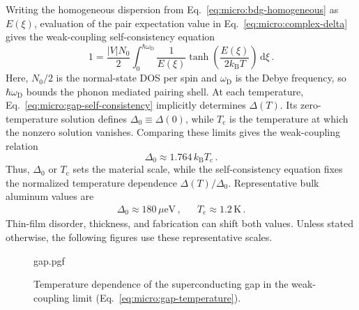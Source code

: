             Writing the homogeneous dispersion from Eq.~\eqref{eq:micro:bdg-homogeneous} as $E(\xi)$, evaluation of the pair expectation value in Eq.~\eqref{eq:micro:complex-delta} gives the weak-coupling self-consistency equation
            \begin{equation}
                1
                =\frac{|V|N_0}{2}
                \int_0^{\hbar\omega_\mathrm{D}}
                \frac{1}{E(\xi)}
                \tanh\!\left(\frac{E(\xi)}{2k_\mathrm{B}T}\right)
                \,\mathrm d\xi\,.
                \label{eq:micro:gap-self-consistency}
            \end{equation}
            Here, $N_0/2$ is the normal-state DOS per spin and $\omega_\mathrm{D}$ is the Debye frequency, so $\hbar\omega_\mathrm{D}$ bounds the phonon mediated pairing shell. At each temperature, Eq.~\eqref{eq:micro:gap-self-consistency} implicitly determines $\Delta(T)$. Its zero-temperature solution defines $\Delta_0\equiv\Delta(0)$, while $T_\mathrm{c}$ is the temperature at which the nonzero solution vanishes. Comparing these limits gives the weak-coupling relation
            \begin{equation}
                \Delta_0
                \approx 1.764\, k_\mathrm{B} T_\mathrm{c}\,.
                \label{eq:micro:gap-zero-temperature}
            \end{equation}
            Thus, $\Delta_0$ or $T_\mathrm{c}$ sets the material scale, while the self-consistency equation fixes the normalized temperature dependence $\Delta(T)/\Delta_0$. \cite{bardeen_theory_1957,tinkham_introduction_2004}
            Representative bulk aluminum values are
            \begin{align}
                \Delta_0 \approx 180\,\mu\mathrm{eV}\,, &&
                T_\mathrm{c} \approx 1.2\,\mathrm{K}\,.
                \label{eq:micro:aluminum-scales}
            \end{align}
            Thin-film disorder, thickness, and fabrication can shift both values. Unless stated otherwise, the following figures use these representative scales. \cite{giaever_study_1961,tinkham_introduction_2004}

            \begin{figure}
                \captionsetup{format=plain}%
                \centering
                \vspace{-1em}
                {gap.pgf}
                \vspace{-.5em}
                \caption{Temperature dependence of the superconducting gap in the weak-coupling limit (Eq.~\ref{eq:micro:gap-temperature}).}
                \label{fig:micro:gap}
            \end{figure}

